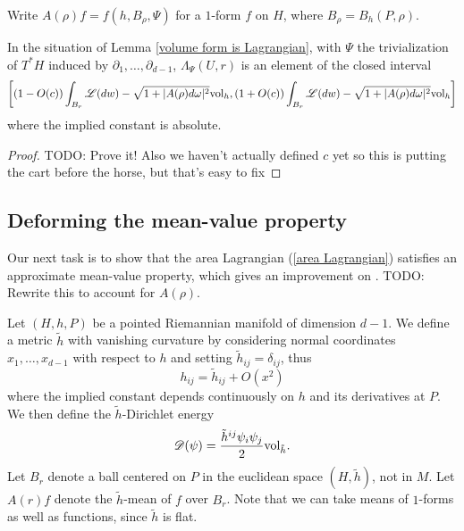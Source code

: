 \begin{notation}
Write $A(\rho)f = f(h, B_\rho, \Psi)$ for a $1$-form $f$ on $H$, where $B_\rho = B_h(P, \rho)$.
\end{notation}

\begin{lemma}\label{excess vs MVP}
In the situation of Lemma \ref{volume form is Lagrangian}, with $\Psi$ the trivialization of $T^* H$ induced by $\partial_1, \dots, \partial_{d - 1}$, $\Lambda_\Psi(U, r)$ is an element of the closed interval
$$\left[(1 - O(c))\int_{B_r} \mathscr L(dw) - \sqrt{1 + |A(\rho)d\omega|^2}\mathrm{vol}_h, (1 + O(c)) \int_{B_r} \mathscr L(dw) - \sqrt{1 + |A(\rho)d\omega|^2}\mathrm{vol}_h\right]$$
where the implied constant is absolute.
\end{lemma}
\begin{proof}
TODO: Prove it! Also we haven't actually defined $c$ yet so this is putting the cart before the horse, but that's easy to fix
\end{proof}


\subsection{Deforming the mean-value property}
Our next task is to show that the area Lagrangian (\ref{area Lagrangian}) satisfies an approximate mean-value property, which gives an improvement on \cite[Teorema 4.3]{Miranda66}.
TODO: Rewrite this to account for $A(\rho)$.

\begin{notation}
Let $(H, h, P)$ be a pointed Riemannian manifold of dimension $d - 1$.
We define a metric $\tilde h$ with vanishing curvature by considering normal coordinates $x_1, \dots, x_{d - 1}$ with respect to $h$ and setting $\tilde h_{ij} = \delta_{ij}$, thus
$$h_{ij} = \tilde h_{ij} + O(x^2)$$
where the implied constant depends continuously on $h$ and its derivatives at $P$.
We then define the $\tilde h$-Dirichlet energy
$$\mathscr D(\psi) = \frac{\tilde h^{ij} \psi_i \psi_j}{2}\mathrm{vol}_{\tilde h}.$$
Let $B_r$ denote a ball centered on $P$ in the euclidean space $(H, \tilde h)$, not in $M$.
Let $A(r)f$ denote the $\tilde h$-mean of $f$ over $B_r$.
Note that we can take means of $1$-forms as well as functions, since $\tilde h$ is flat.
\end{notation}

